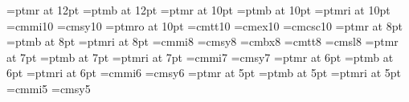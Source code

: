 %
\font\twelverm=ptmr at 12pt  %
\font\twelvebf=ptmb at 12pt  %
\font\tenrm=ptmr at 10pt
\font\tenbf=ptmb at 10pt
\font\tenit=ptmri at 10pt %
\font\teni=cmmi10
\font\tensy=cmsy10
\font\tensl=ptmro at 10pt %
\font\tentt=cmtt10
\font\tenex=cmex10
\font\tencsc=cmcsc10
\font\eightrm=ptmr at 8pt
\font\eightbf=ptmb at 8pt
\font\eightit=ptmri at 8pt
\font\eighti=cmmi8
\font\eightsy=cmsy8
\font\eightbf=cmbx8
\font\eighttt=cmtt8
\font\eightsl=cmsl8
\font\sevenrm=ptmr at 7pt
\font\sevenbf=ptmb at 7pt
\font\sevenit=ptmri at 7pt
\font\seveni=cmmi7
\font\sevensy=cmsy7
\font\sixrm=ptmr at 6pt
\font\sixbf=ptmb at 6pt
\font\sixit=ptmri at 6pt
\font\sixi=cmmi6
\font\sixsy=cmsy6
\font\fiverm=ptmr at 5pt
\font\fivebf=ptmb at 5pt
\font\fiveit=ptmri at 5pt
\font\fivei=cmmi5
\font\fivesy=cmsy5
\def\em{\it}
\def\hexnumber#1{\ifcase#1 0\or1\or2\or3\or4\or5\or6\or7\or8\or9\or
 A\or B\or C\or D\or E\or F\fi}
